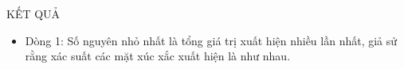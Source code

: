 KẾT QUẢ  
\begin{itemize}
	\item     Dòng 1: Số nguyên nhỏ nhất là tổng giá trị xuất hiện nhiều lần nhất, giả sử rằng         xác suất các mặt xúc xắc xuất hiện là như nhau.   
\end{itemize}